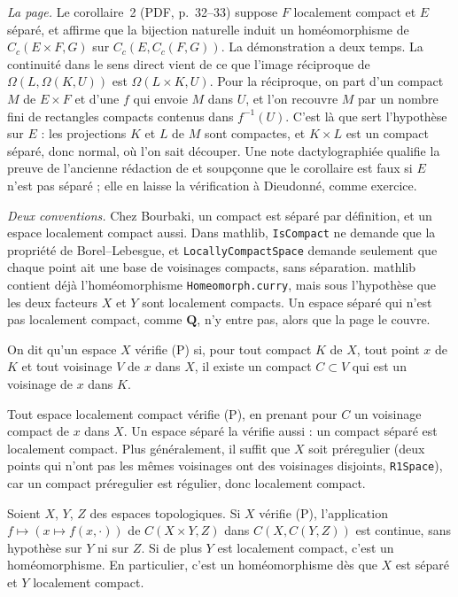 \emph{La page.} Le corollaire~2 (PDF, p.~32--33) suppose $F$ localement compact et $E$ séparé, et affirme que la bijection naturelle induit un homéomorphisme de $C_c(E \times F, G)$ sur $C_c(E, C_c(F, G))$. La démonstration a deux temps. La continuité dans le sens direct vient de ce que l'image réciproque de $\Omega(L, \Omega(K, U))$ est $\Omega(L \times K, U)$. Pour la réciproque, on part d'un compact $M$ de $E \times F$ et d'une $f$ qui envoie $M$ dans $U$, et l'on recouvre $M$ par un nombre fini de rectangles compacts contenus dans $f^{-1}(U)$. C'est là que sert l'hypothèse sur $E$ : les projections $K$ et $L$ de $M$ sont compactes, et $K \times L$ est un compact séparé, donc normal, où l'on sait découper. Une note dactylographiée qualifie la preuve de l'ancienne rédaction de  et soupçonne que le corollaire est faux si $E$ n'est pas séparé ; elle en laisse la vérification à Dieudonné, comme exercice.

\emph{Deux conventions.} Chez Bourbaki, un compact est séparé par définition, et un espace localement compact aussi. Dans mathlib, \texttt{IsCompact} ne demande que la propriété de Borel--Lebesgue, et \texttt{LocallyCompactSpace} demande seulement que chaque point ait une base de voisinages compacts, sans séparation. mathlib contient déjà l'homéomorphisme \texttt{Homeomorph.\allowbreak{}curry}, mais sous l'hypothèse que les deux facteurs $X$ et $Y$ sont localement compacts. Un espace séparé qui n'est pas localement compact, comme $\mathbf Q$, n'y entre pas, alors que la page le couvre.

\begin{definition}
On dit qu'un espace $X$ vérifie (P) si, pour tout compact $K$ de $X$, tout point $x$ de $K$ et tout voisinage $V$ de $x$ dans $X$, il existe un compact $C \subset V$ qui est un voisinage de $x$ dans $K$.
\end{definition}

Tout espace localement compact vérifie (P), en prenant pour $C$ un voisinage compact de $x$ dans $X$. Un espace séparé la vérifie aussi : un compact séparé est localement compact. Plus généralement, il suffit que $X$ soit préregulier (deux points qui n'ont pas les mêmes voisinages ont des voisinages disjoints, \texttt{R1Space}), car un compact préregulier est régulier, donc localement compact.

\begin{enonce}
Soient $X$, $Y$, $Z$ des espaces topologiques. Si $X$ vérifie (P), l'application $f \mapsto (x \mapsto f(x, \cdot))$ de $C(X \times Y, Z)$ dans $C(X, C(Y, Z))$ est continue, sans hypothèse sur $Y$ ni sur $Z$. Si de plus $Y$ est localement compact, c'est un homéomorphisme. En particulier, c'est un homéomorphisme dès que $X$ est séparé et $Y$ localement compact.
\end{enonce}

